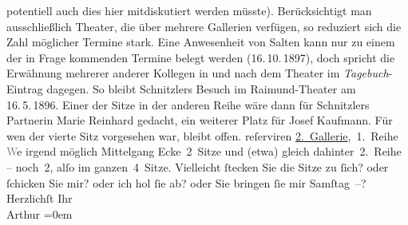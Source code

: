 \begin{ledgroupsized}[t]{13cm}
{{{                  potentiell auch dies hier mitdiskutiert werden müsste). Berücksichtigt man ausschließlich Theater, die
                  über mehrere Gallerien verfügen, so reduziert sich die Zahl möglicher Termine stark. Eine Anwesenheit von
                  Salten kann nur zu einem der in Frage kommenden Termine belegt werden
                  (16. 10. 1897), doch spricht die Erwähnung
                  mehrerer anderer Kollegen in und nach dem Theater im \emph{Tagebuch}-Eintrag 
                  dagegen. So bleibt Schnitzlers Besuch
                  im Raimund-Theater am 16. 5. 1896.
                  Einer der Sitze in der anderen Reihe wäre dann für Schnitzlers Partnerin Marie Reinhard
                  gedacht, ein weiterer Platz für Josef Kaufmann. 
                  Für wen der vierte Sitz vorgesehen war, bleibt offen.}}}\label{K_L03035-1h} reſerviren\pend
           \pstart
           \uline{2. Gallerie}, 1. Reihe\pend
           \pstart
           \textcolor{gray}{W}e{\geminationn} irgend möglich Mittelgang
               Ecke 2 Sitze und \introOben{}(etwa)\introOben{} gleich dahinter 2. Reihe – noch 2,
               alſo {\pb}im ganzen 4 Sitze.\pend
           \pstart
           Vielleicht ſtecken Sie die Sitze zu ſich? oder ſchicken Sie mir? oder ich hol ſie ab?
               oder Sie bringen ſie mir Samſtag –?\pend
           \pstart
           Herzlichſt Ihr {\\[\baselineskip]}\spacefill\mbox{Arthur}\pend
           \leftskip=0em{}
         
         \endnumbering{}\end{ledgroupsized}  \newcommand{\dateiname}{L03035}\newcommand{\titel}{Arthur Schnitzler an Felix Salten, [14. 5. 1896?]}\newcommand{\editorInnen}{Martin Anton Müller und Laura Untner}
      